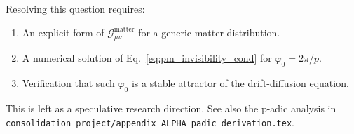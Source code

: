 Resolving this question requires:
\begin{enumerate}
  \item An explicit form of $\mathcal{G}_{\mu\nu}^\mathrm{matter}$ for a generic matter distribution.
  \item A numerical solution of Eq.~\eqref{eq:pm_invisibility_cond} for $\varphi_0 = 2\pi/p$.
  \item Verification that such $\varphi_0$ is a stable attractor of the drift-diffusion equation.
\end{enumerate}

This is left as a speculative research direction.  See also the p-adic analysis in
\texttt{consolidation\_project/appendix\_ALPHA\_padic\_derivation.tex}.

